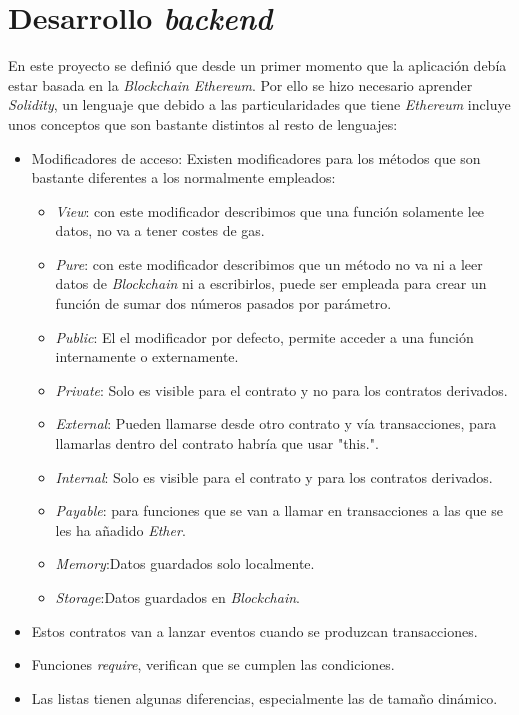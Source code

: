 \section{Desarrollo \textit{backend}}
En este proyecto se definió que desde un primer momento que la aplicación debía estar basada en la \textit{Blockchain} \textit{Ethereum}. Por ello se hizo necesario aprender \textit{Solidity}, un lenguaje que debido a las particularidades que tiene \textit{Ethereum} incluye unos conceptos que son bastante distintos al resto de lenguajes:
\begin{itemize}
    \item Modificadores de acceso: Existen modificadores \cite{solidityesContratosx2014} para los métodos que son bastante diferentes a los normalmente empleados:
    \begin{itemize}
        \item \textit{View}: con este modificador describimos que una función solamente lee datos, no va a tener costes de gas.
        \item \textit{Pure}: con este modificador describimos que un método no va ni a leer datos de \textit{Blockchain} ni a escribirlos, puede ser empleada para crear un función de sumar dos números pasados por parámetro.
        \item \textit{Public}: El el modificador por defecto, permite acceder a una función internamente o externamente.
        \item \textit{Private}: Solo es visible para el contrato y no para los contratos derivados.
        \item \textit{External}: Pueden llamarse desde otro contrato y vía transacciones, para llamarlas dentro del contrato habría que usar "this.".
        \item \textit{Internal}: Solo es visible para el contrato y  para los contratos derivados.
         \item \textit{Payable}: para funciones que se van a llamar en transacciones a las que se les ha añadido \textit{Ether}.
         \item \textit{Memory}:Datos guardados solo localmente.
         \item \textit{Storage}:Datos guardados en \textit{Blockchain}.
    \end{itemize}
    \item Estos contratos van a lanzar eventos cuando se produzcan transacciones.
    \item Funciones \textit{require}, verifican que se cumplen las condiciones.
    \item Las listas tienen algunas diferencias, especialmente las de tamaño dinámico.
\end{itemize}

